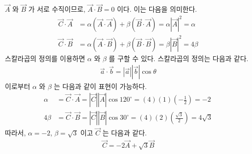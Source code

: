 \documentclass[APS,floatfix,nofootinbib,superscriptaddress,fleqn,preprint]{revtex4}
\begin{document}
 $\vec{A}$ 와 $\vec{B}$ 가 서로 수직이므로,
$\vec{A} \cdot \vec{B} =0 $ 이다. 이는 다음을 의미한다. 
\begin{align*}
  \vec{C} \cdot \vec{A} &=
 \alpha(\vec{A}\cdot\vec{A}) + \beta(\vec{B}\cdot\vec{A})
   = \alpha|\vec{A}|^2=\alpha \\ 
  \vec{C} \cdot \vec{B} &= \alpha(\vec{A}\cdot\vec{B}) +
                          \beta(\vec{B}\cdot\vec{B})
                          =\beta|\vec{B}|^2=4\beta  
\end{align*}
스칼라곱의 정의를 이용하면 $\alpha$ 와 $\beta$ 를 구할 수
있다. 스칼라곱의 정의는 다음과 같다. 
\begin{align*}
  \vec{a} \cdot \vec{b} = |\vec{a}||\vec{b}|\cos{\theta}
\end{align*}
이로부터 $\alpha$ 와 $\beta$ 는 다음과 같이 표현이 가능하다.
\begin{align*}
  \alpha &= \vec{C} \cdot \vec{A} =|\vec{C}||\vec{A}|\cos{120^{\circ}}
           = (4) (1) \left(-\frac{1}{2}\right) = -2 \\ 
  4\beta &= \vec{C} \cdot \vec{B} =|\vec{C}||\vec{B}|\cos{30^{\circ}}
           = (4) (2)\left(\frac{\sqrt{3}}{2}\right) = 4\sqrt{3} 
\end{align*}
따라서, $\alpha = -2$, $\beta = \sqrt{3}$ 이고 $\vec{C}$ 는 다음과 같다.
\begin{align*}
  \vec{C} = -2 \vec{A} + \sqrt{3} \vec{B}
\end{align*}
\vspace{0.5cm}
\end{document}
